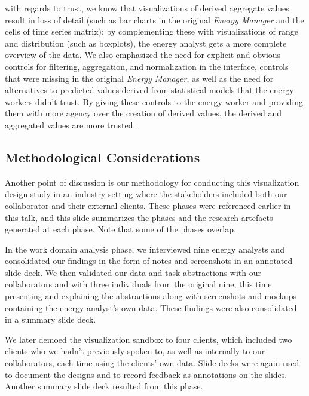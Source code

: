 \documentclass[journal]{vgtc}                %
\newcommand{\bstart}[1]{\vspace{1mm} \noindent{\textbf{#1:}}}
\begin{document}
\bstart{Trust} with regards to trust, we know that visualizations of derived aggregate values result in loss of detail (such as bar charts in the original {\it Energy Manager} and the cells of time series matrix): by complementing these with visualizations of range and distribution (such as boxplots), the energy analyst gets a more complete overview of the data.
We also emphasized the need for explicit and obvious controls for filtering, aggregation, and normalization in the interface, controls that were missing in the original {\it Energy Manager}, as well as the need for alternatives to predicted values derived from statistical models that the energy workers didn't trust. 
By giving these controls to the energy worker and providing them with more agency over the creation of derived values, the derived and aggregated values are more trusted. 


\subsection{Methodological Considerations}
\label{discussion-methodology}


Another point of discussion is our methodology for conducting this visualization design study in an industry setting where the stakeholders included both our collaborator and their external clients. 
These phases were referenced earlier in this talk, and this slide summarizes the phases and the research artefacts generated at each phase. Note that some of the phases overlap.

In the work domain analysis phase, we interviewed nine energy analysts and consolidated our findings in the form of notes and screenshots in an annotated slide deck.
We then validated our data and task abstractions with our collaborators and with three individuals from the original nine, this time presenting and explaining the abstractions along with screenshots and mockups containing the energy analyst's own data. 
These findings were also consolidated in a summary slide deck.

We later demoed the visualization sandbox to four clients, which included two clients who we hadn't previously spoken to, as well as internally to our collaborators, each time using the clients' own data. 
Slide decks were again used to document the designs and to record feedback as annotations on the slides. Another summary slide deck resulted from this phase.
\end{document}
